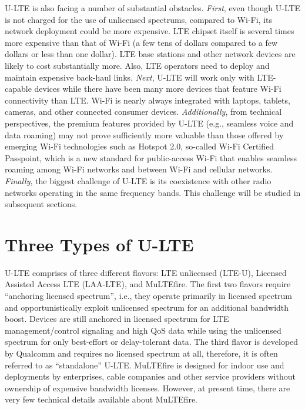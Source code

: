 U-LTE is also facing a number of substantial obstacles. \textit{First}, even though U-LTE is not charged for the use of unlicensed spectrums, compared to Wi-Fi, its network deployment could be more expensive. LTE chipset itself is several times more expensive than that of Wi-Fi (a few tens of dollars compared to a few dollars or less than one dollar). LTE base stations and other network devices are likely to cost substantially more. Also, LTE operators need to deploy and maintain expensive back-haul links. \textit{Next}, U-LTE will work only with LTE-capable devices while there have been many more devices that feature Wi-Fi connectivity than LTE. Wi-Fi is nearly always integrated with laptops, tablets, cameras, and other connected consumer devices. \textit{Additionally}, from technical perspectives, the premium features provided by U-LTE (e.g., seamless voice and data roaming) may not prove sufficiently more valuable than those offered by emerging Wi-Fi technologies such as Hotspot 2.0, so-called Wi-Fi Certified Passpoint, which is a new standard for public-access Wi-Fi that enables seamless roaming among Wi-Fi networks and between Wi-Fi and cellular networks. \textit{Finally}, the biggest challenge of U-LTE is its coexistence with other radio networks operating in the same frequency bands. This challenge will be studied in subsequent sections.

\section{Three Types of U-LTE}
\label{lte-types}
U-LTE comprises of three different flavors: LTE unlicensed (LTE-U), Licensed Assisted Access LTE (LAA-LTE), and MuLTEfire. The first two flavors require ``anchoring licensed spectrum'', i.e., they operate primarily in licensed spectrum and opportunistically exploit unlicensed spectrum for an additional bandwidth boost. Devices are still anchored in licensed spectrum for LTE management/control signaling and high QoS data while using the unlicensed spectrum for only best-effort or delay-tolerant data. The third flavor is developed by Qualcomm and requires no licensed spectrum at all, therefore, it is often referred to as ``standalone'' U-LTE. MuLTEfire is designed for indoor use and deployments by enterprises, cable companies and other service providers without ownership of expensive bandwidth licenses. However, at present time, there are very few technical details available about MuLTEfire.


